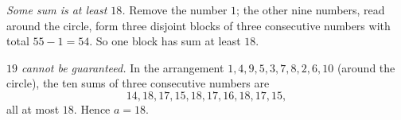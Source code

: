 \emph{Some sum is at least $18$.} Remove the number $1$; the other nine numbers, read around the circle, form three disjoint blocks of three consecutive numbers with total $55-1=54$. So one block has sum at least $18$.

\emph{$19$ cannot be guaranteed.} In the arrangement $1,4,9,5,3,7,8,2,6,10$ (around the circle), the ten sums of three consecutive numbers are
\[14,18,17,15,18,17,16,18,17,15,\]
all at most $18$. Hence $a=\boxed{18}$.
